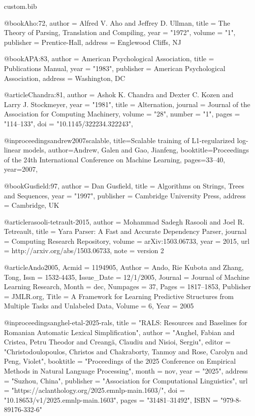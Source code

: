 \begin{filecontents*}[overwrite]{custom.bib}

@book{Aho:72,
    author  = {Alfred V. Aho and Jeffrey D. Ullman},
    title   = {The Theory of Parsing, Translation and Compiling},
    year    = "1972",
    volume  = "1",
    publisher = {Prentice-Hall},
    address = {Englewood Cliffs, NJ}
}

@book{APA:83,
    author  = {{American Psychological Association}},
    title   = {Publications Manual},
    year    = "1983",
    publisher = {American Psychological Association},
    address = {Washington, DC}
}

@article{Chandra:81,
	author = {Ashok K. Chandra and Dexter C. Kozen and Larry J. Stockmeyer},
	year = "1981",
	title = {Alternation},
	journal = {Journal of the Association for Computing Machinery},
	volume = "28",
	number = "1",
	pages = "114--133",
	doi = "10.1145/322234.322243",
}

@inproceedings{andrew2007scalable,
  title={Scalable training of {L1}-regularized log-linear models},
  author={Andrew, Galen and Gao, Jianfeng},
  booktitle={Proceedings of the 24th International Conference on Machine Learning},
  pages={33--40},
  year={2007},
}

@book{Gusfield:97,
    author  = {Dan Gusfield},
    title   = {Algorithms on Strings, Trees and Sequences},
    year    = "1997",
    publisher = {Cambridge University Press},
    address = {Cambridge, UK}
}

@article{rasooli-tetrault-2015,
    author    = {Mohammad Sadegh Rasooli and Joel R. Tetreault},
    title     = {Yara Parser: {A} Fast and Accurate Dependency Parser},
    journal   = {Computing Research Repository},
    volume    = {arXiv:1503.06733},
    year      = {2015},
    url       = {http://arxiv.org/abs/1503.06733},
    note    = {version 2}
}

@article{Ando2005,
	Acmid = {1194905},
	Author = {Ando, Rie Kubota and Zhang, Tong},
	Issn = {1532-4435},
	Issue_Date = {12/1/2005},
	Journal = {Journal of Machine Learning Research},
	Month = dec,
	Numpages = {37},
	Pages = {1817--1853},
	Publisher = {JMLR.org},
	Title = {A Framework for Learning Predictive Structures from Multiple Tasks and Unlabeled Data},
	Volume = {6},
	Year = {2005}
}


@inproceedings{anghel-etal-2025-rals,
    title = "{RALS}: Resources and Baselines for {R}omanian Automatic Lexical Simplification",
    author = "Anghel, Fabian  and
      Cristea, Petru Theodor  and
      Creang{\u a}, Claudiu  and
      Nisioi, Sergiu",
    editor = "Christodoulopoulos, Christos  and
      Chakraborty, Tanmoy  and
      Rose, Carolyn  and
      Peng, Violet",
    booktitle = "Proceedings of the 2025 Conference on Empirical Methods in Natural Language Processing",
    month = nov,
    year = "2025",
    address = "Suzhou, China",
    publisher = "Association for Computational Linguistics",
    url = "https://aclanthology.org/2025.emnlp-main.1603/",
    doi = "10.18653/v1/2025.emnlp-main.1603",
    pages = "31481--31492",
    ISBN = "979-8-89176-332-6"
}


\end{filecontents*}
